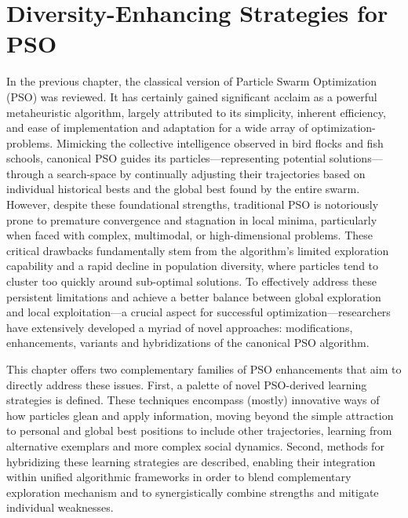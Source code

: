 \chapter[Diversity-Enhancing Strategies]{Diversity-Enhancing Strategies for PSO}
\label{cp:strategies}

{


In the previous chapter, the classical version of Particle Swarm Optimization (PSO) was reviewed.
It has certainly gained significant acclaim as a powerful \gls{metaheuristic} algorithm, largely attributed to its simplicity, inherent efficiency, and ease of implementation and adaptation for a wide array of \glspl{optimization-problem}. Mimicking the collective intelligence observed in bird flocks and fish schools, canonical PSO guides its particles---representing potential solutions---through a \gls{search-space} by continually adjusting their trajectories based on individual historical bests and the global best found by the entire swarm. However, despite these foundational strengths, traditional PSO is notoriously prone to premature convergence and stagnation in local minima, particularly when faced with complex, multimodal, or high-dimensional problems. These critical drawbacks fundamentally stem from the algorithm's limited exploration capability and a rapid decline in population diversity, where particles tend to cluster too quickly around sub-optimal solutions.
To effectively address these persistent limitations and achieve a better balance between global exploration and local exploitation---a crucial aspect for successful optimization---researchers have extensively developed a myriad of novel approaches: modifications, enhancements, variants and hybridizations of the canonical PSO algorithm.

This chapter offers two complementary families of PSO enhancements that aim to directly address these issues.
First, a palette of novel PSO-derived learning strategies is defined. These techniques encompass (mostly) innovative ways of how particles glean and apply information, moving beyond the simple attraction to personal and global best positions to include other trajectories, learning from alternative exemplars and more complex social dynamics.
Second, methods for hybridizing these learning strategies are described, enabling their integration within unified algorithmic frameworks in order to blend complementary exploration mechanism
and to synergistically combine strengths and mitigate individual weaknesses.


}
